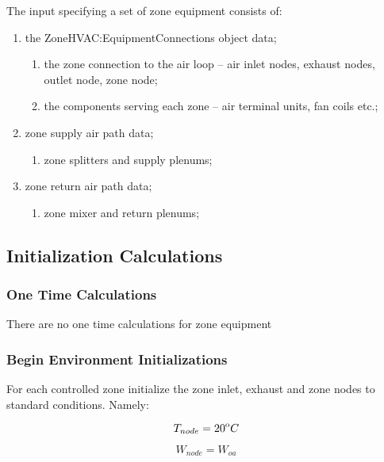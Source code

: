 The input specifying a set of zone equipment consists of:

\begin{enumerate}
  \item
    the ZoneHVAC:EquipmentConnections object data;
    \begin{enumerate}
      \item the zone connection to the air loop – air inlet nodes, exhaust nodes, outlet node, zone node;
      \item the components serving each zone – air terminal units, fan coils etc.;
    \end{enumerate}
  \item
    zone supply air path data;
    \begin{enumerate}
      \item zone splitters and supply plenums;
    \end{enumerate}
  \item
    zone return air path data;
    \begin{enumerate}
      \item zone mixer and return plenums;
    \end{enumerate}
\end{enumerate}

\subsection{Initialization Calculations}\label{initialization-calculations-000}

\subsubsection{One Time Calculations}\label{one-time-calculations-000}

There are no one time calculations for zone equipment

\subsubsection{Begin Environment Initializations}\label{begin-environment-initializations-000}

For each controlled zone initialize the zone inlet, exhaust and zone nodes to standard conditions. Namely:

\begin{equation}
{T_{node}} = {20^{\rm{o}}}C
\end{equation}

\begin{equation}
{W_{node}} = {W_{oa}}
\end{equation}

